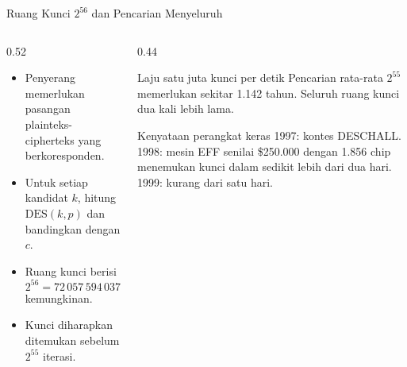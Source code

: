 \documentclass[aspectratio=169,11pt]{beamer}
\begin{document}
\begin{frame}{Ruang Kunci $2^{56}$ dan Pencarian Menyeluruh}
    \footnotesize
    \begin{columns}[T,onlytextwidth]
        \begin{column}{0.52\textwidth}
            \begin{itemize}
                \item Penyerang memerlukan pasangan plainteks-cipherteks
                      yang berkoresponden.
                \item Untuk setiap kandidat $k$, hitung
                      $\mathrm{DES}(k,p)$ dan bandingkan dengan $c$.
                \item Ruang kunci berisi
                      \[
                          2^{56}=72\,057\,594\,037\,927\,936
                      \]
                      kemungkinan.
                \item Kunci diharapkan ditemukan sebelum $2^{55}$
                      iterasi.
            \end{itemize}
        \end{column}
        \begin{column}{0.44\textwidth}
            \begin{exampleblock}{Laju satu juta kunci per detik}
                \footnotesize
                Pencarian rata-rata $2^{55}$ memerlukan sekitar 1.142
                tahun. Seluruh ruang kunci dua kali lebih lama.
            \end{exampleblock}
            \begin{alertblock}{Kenyataan perangkat keras}
                \footnotesize
                1997: kontes DESCHALL. 1998: mesin EFF senilai \$250.000
                dengan 1.856 chip menemukan kunci dalam sedikit lebih
                dari dua hari. 1999: kurang dari satu hari.
            \end{alertblock}
        \end{column}
    \end{columns}
\end{frame}
\end{document}
